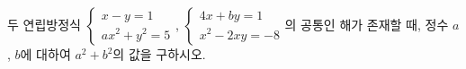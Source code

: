 두 연립방정식 $\begin{cases} x-y=1 \\ ax^2+y^2=5 \end{cases}$, $\begin{cases} 4x+by=1 \\ x^2-2xy=-8 \end{cases}$의 공통인 해가 존재할 때, 정수 $a$, $b$에 대하여 $a^2+b^2$의 값을 구하시오.
